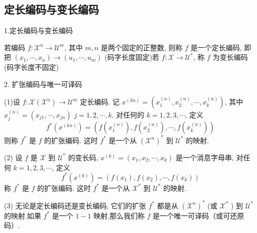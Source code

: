 \subsection{定长编码与变长编码}
1.定长编码与变长编码
\begin{definition}
    若编码 $ f: \mathscr{X}^{n} \rightarrow \mathscr{U}^{m} $, 其中 $ m, n $ 是两个固定的正整数, 则称 $ f $ 是一个定长编码, 即把 $ \left(x_{1}, \cdots, x_{n}\right) \rightarrow\left(u_{1}, \cdots, u_{m}\right) $ (码字长度固定)若 $ f: \mathscr{X} \rightarrow \mathscr{U}^{*} $, 称 $ f $ 为变长编码(码字长度不固定)
\end{definition}
2. 扩张编码与唯一可译码
\begin{definition}
    (1)设 $ f: \mathscr{X}\left(\mathscr{X}^{n}\right) \rightarrow \mathscr{U}^{m} $ 定长编码. 记 $ x^{(k n)}=\left(x_{1}^{(n)}, x_{2}^{(n)}, \cdots, x_{k}^{(n)}\right) $, 其中 $ x_{j}^{(n)}=\left(x_{j 1}, \cdots, x_{j n}\right) $ $ j=1,2, \cdots, k $. 对任何的 $ k=1,2,3, \cdots $, 定义
$$
f^{*}\left(x^{(k n)}\right)=\left(f\left(x_{1}^{(n)}\right), f\left(x_{2}^{(n)}\right), \cdots, f\left(x_{k}^{(n)}\right)\right)
$$
则称 $ f^{*} $ 是 $ f $ 的扩张编码. 这时 $ f^{*} $ 是一个从 $ \left(\mathscr{X}^{n}\right)^{*} $ 到 $ \mathscr{U}^{*} $ 的映射.

(2) 设 $ f $ 是 $ \mathscr{X} $ 到 $ \mathscr{U}^{*} $ 的变长码, $ x^{(k)}=\left(x_{1}, x_{2}, \cdots, x_{k}\right) $ 是一个消息字母串, 对任何 $ k=1,2,3, \cdots $, 定义
$$
f^{*}\left(x^{(k)}\right)=\left(f\left(x_{1}\right), f\left(x_{2}\right), \cdots, f\left(x_{k}\right)\right)
$$
称 $ f^{*} $ 是 $ f $ 的扩张编码. 这时 $ f^{*} $ 是一个从 $ \mathscr{X}^{*} $ 到 $ \mathscr{U}^{*} $ 的映射.

(3) 无论是定长编码还是变长编码, 它们的扩张 $ f^{*} $ 都是从 $ \left(\mathscr{X}^{n}\right)^{*} $ (或 $ \mathscr{X}^{*} $ ) 到 $ \mathscr{U}^{*} $ 的映射.如果 $ f^{*} $ 是一个 $ 1-1 $ 映射,那么我们称 $ f $ 是一个唯一可译码（或可还原码）.
\end{definition}

